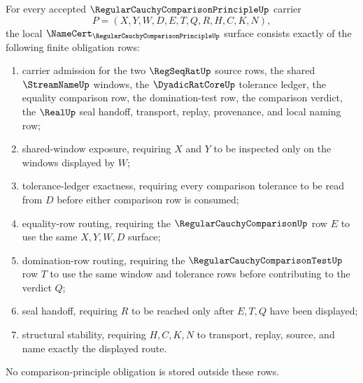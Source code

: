\begin{theorem}
\label{thm:regular-cauchy-comparison-principle-namecert-obligations}
For every accepted $\RegularCauchyComparisonPrincipleUp$ carrier
$$
P=(X,Y,W,D,E,T,Q,R,H,C,K,N),
$$
the local $\NameCert_{\RegularCauchyComparisonPrincipleUp}$ surface consists exactly of the following finite obligation rows:
\begin{enumerate}
\item carrier admission for the two $\RegSeqRatUp$ source rows, the shared $\StreamNameUp$ windows, the $\DyadicRatCoreUp$ tolerance ledger, the equality comparison row, the domination-test row, the comparison verdict, the $\RealUp$ seal handoff, transport, replay, provenance, and local naming row;
\item shared-window exposure, requiring $X$ and $Y$ to be inspected only on the windows displayed by $W$;
\item tolerance-ledger exactness, requiring every comparison tolerance to be read from $D$ before either comparison row is consumed;
\item equality-row routing, requiring the $\RegularCauchyComparisonUp$ row $E$ to use the same $X,Y,W,D$ surface;
\item domination-row routing, requiring the $\RegularCauchyComparisonTestUp$ row $T$ to use the same window and tolerance rows before contributing to the verdict $Q$;
\item seal handoff, requiring $R$ to be reached only after $E,T,Q$ have been displayed;
\item structural stability, requiring $H,C,K,N$ to transport, replay, source, and name exactly the displayed route.
\end{enumerate}
No comparison-principle obligation is stored outside these rows.
\end{theorem}
